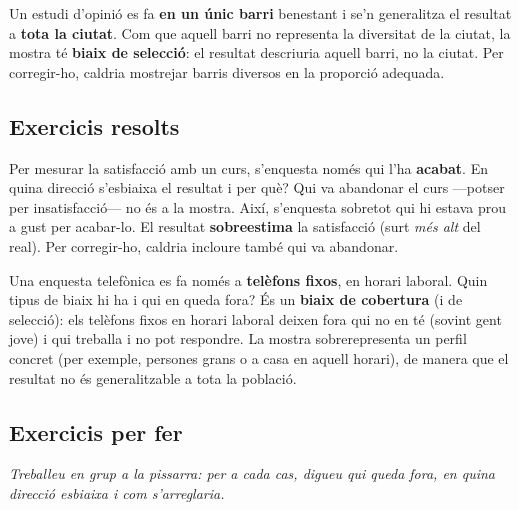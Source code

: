 \begin{exemple}
Un estudi d'opinió es fa \textbf{en un únic barri} benestant i se'n generalitza el resultat
a \textbf{tota la ciutat}. Com que aquell barri no representa la diversitat de la ciutat, la
mostra té \textbf{biaix de selecció}: el resultat descriuria aquell barri, no la ciutat.
Per corregir-ho, caldria mostrejar barris diversos en la proporció adequada.
\end{exemple}

\subsection{Exercicis resolts}

\begin{exresolt}
Per mesurar la satisfacció amb un curs, s'enquesta només qui l'ha \textbf{acabat}. En quina
direcció s'esbiaixa el resultat i per què?
\solucio
Qui va abandonar el curs —potser per insatisfacció— no és a la mostra. Així, s'enquesta
sobretot qui hi estava prou a gust per acabar-lo. El resultat \textbf{sobreestima} la
satisfacció (surt \emph{més alt} del real). Per corregir-ho, caldria incloure també qui va
abandonar.
\end{exresolt}

\begin{exresolt}
Una enquesta telefònica es fa només a \textbf{telèfons fixos}, en horari laboral. Quin
tipus de biaix hi ha i qui en queda fora?
\solucio
És un \textbf{biaix de cobertura} (i de selecció): els telèfons fixos en horari laboral
deixen fora qui no en té (sovint gent jove) i qui treballa i no pot respondre. La mostra
sobrerepresenta un perfil concret (per exemple, persones grans o a casa en aquell horari),
de manera que el resultat no és generalitzable a tota la població.
\end{exresolt}

\subsection{Exercicis per fer}

\noindent\textit{Treballeu en grup a la pissarra: per a cada cas, digueu qui queda fora, en
quina direcció esbiaixa i com s'arreglaria.}


